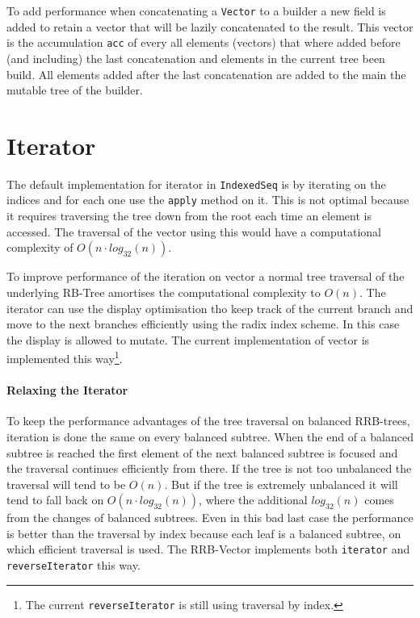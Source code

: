  To add performance when concatenating a \texttt{Vector} to a builder a new field is added to retain a vector that will be lazily concatenated to the result. This vector is the accumulation \texttt{acc} of every all elements (vectors) that where added before (and including) the last concatenation and elements in the current tree been build. All elements added after the last concatenation are added to the main the mutable tree of the builder.


\clearpage
\section{Iterator}
The default implementation for iterator in \texttt{IndexedSeq} is by iterating on the indices and for each one use the \texttt{apply} method on it. This is not optimal because it requires traversing the tree down from the root each time an element is accessed. The traversal of the vector using this would have a computational complexity of $O(n \cdot log_{32}(n))$.

To improve performance of the iteration on vector a normal tree traversal of the underlying RB-Tree amortises the computational complexity to $O(n)$. The iterator can use the display optimisation tho keep track of the current branch and move to the next branches efficiently using the radix index scheme. In this case the display is allowed to mutate. The current implementation of vector is implemented this way\footnote{The current \texttt{reverseIterator} is still using traversal by index.}.

\paragraph{Relaxing the Iterator}
To keep the performance advantages of the tree traversal on balanced RRB-trees, iteration is done the same on every balanced subtree. When the end of a balanced subtree is reached the first element of the next balanced subtree is focused and the traversal continues efficiently from there. If the tree is not too unbalanced the traversal will tend to be $O(n)$. But if the tree is extremely unbalanced it will tend to fall back on $O(n \cdot log_{32}(n))$, where the additional $log_{32}(n)$ comes from the changes of balanced subtrees. Even in this bad last case the performance is better than the traversal by index because each leaf is a balanced subtree, on which efficient traversal is used. The RRB-Vector implements both \texttt{iterator} and \texttt{reverseIterator} this way.






